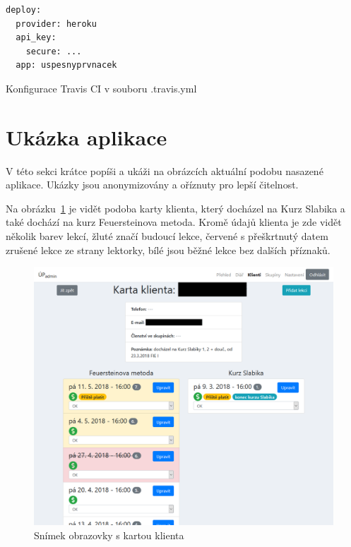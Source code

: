     \begin{listing}[ht]
    	\begin{verbatim}
deploy:
  provider: heroku
  api_key:
    secure: ...
  app: uspesnyprvnacek
    	\end{verbatim}
    	\caption{Konfigurace Travis CI v souboru .travis.yml}\label{travis2}
    \end{listing}
    
    \section{Ukázka aplikace}
    V této sekci krátce popíši a ukáži na obrázcích aktuální podobu nasazené aplikace. Ukázky jsou anonymizovány a oříznuty pro lepší čitelnost.
    
    Na obrázku~\ref{fig:screen-karta} je vidět podoba karty klienta, který docházel na Kurz Slabika a také dochází na kurz Feuersteinova metoda. Kromě údajů klienta je zde vidět několik barev lekcí, žluté značí budoucí lekce, červené s přeškrtnutý datem zrušené lekce ze strany lektorky, bílé jsou běžné lekce bez dalších příznaků.
        
        \begin{figure}\centering
        	\includegraphics[width=1\textwidth]{img/screenshoty/screen-karta.png}
        	\caption{Snímek obrazovky s kartou klienta}\label{fig:screen-karta}
        \end{figure}
    
